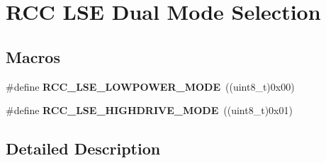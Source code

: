 \hypertarget{group___r_c_c_ex___l_s_e___dual___mode___selection}{}\section{R\+CC L\+SE Dual Mode Selection}
\label{group___r_c_c_ex___l_s_e___dual___mode___selection}
\subsection*{Macros}
\begin{DoxyCompactItemize}
\item 
\#define {\bfseries R\+C\+C\+\_\+\+L\+S\+E\+\_\+\+L\+O\+W\+P\+O\+W\+E\+R\+\_\+\+M\+O\+DE}~((uint8\+\_\+t)0x00)\hypertarget{group___r_c_c_ex___l_s_e___dual___mode___selection_ga91eededb6ce1d781b3787e3c666cda55}{}\label{group___r_c_c_ex___l_s_e___dual___mode___selection_ga91eededb6ce1d781b3787e3c666cda55}

\item 
\#define {\bfseries R\+C\+C\+\_\+\+L\+S\+E\+\_\+\+H\+I\+G\+H\+D\+R\+I\+V\+E\+\_\+\+M\+O\+DE}~((uint8\+\_\+t)0x01)\hypertarget{group___r_c_c_ex___l_s_e___dual___mode___selection_gac289e51921d5065c6dc55c0cc752be1d}{}\label{group___r_c_c_ex___l_s_e___dual___mode___selection_gac289e51921d5065c6dc55c0cc752be1d}

\end{DoxyCompactItemize}


\subsection{Detailed Description}
